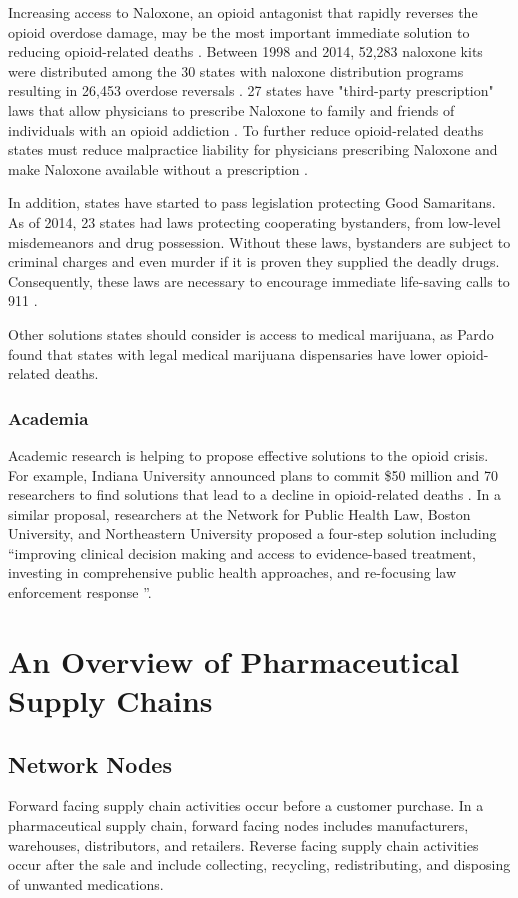 \documentclass[sigconf]{acmart}
\begin{document}
Increasing access to Naloxone, an opioid antagonist that rapidly reverses the opioid overdose damage, may be the most important immediate solution to reducing opioid-related deaths \cite{Hawk01}. Between 1998 and 2014, 52,283 naloxone kits were distributed among the 30 states with naloxone distribution programs resulting in 26,453 overdose reversals \cite{Hawk01}. 27 states have "third-party prescription" laws that allow physicians to prescribe Naloxone to family and friends of individuals with an opioid addiction \cite{Hawk01}. To further reduce opioid-related deaths states must reduce malpractice liability for physicians prescribing Naloxone and make Naloxone available without a prescription \cite{Hawk01}.

In addition, states have started to pass legislation protecting Good Samaritans. As of 2014, 23 states had laws protecting cooperating bystanders, from low-level misdemeanors and drug possession. Without these laws, bystanders are subject to criminal charges and even murder if it is proven they supplied the deadly drugs. Consequently, these laws are necessary to encourage immediate life-saving calls to 911 \cite{Burris01} \cite{Hawk01}. 

Other solutions states should consider is access to medical marijuana, as Pardo \cite{pardo01} found that states with legal medical marijuana dispensaries have lower opioid-related deaths.

\subsubsection{Academia}
Academic research is helping to propose effective solutions to the opioid crisis. For example, Indiana University announced plans to commit \$50 million and 70 researchers to find solutions that lead to a decline in opioid-related deaths \cite{Rudavsky01}. In a similar proposal, researchers at the Network for Public Health Law, Boston University, and Northeastern University proposed a four-step solution including ``improving clinical decision making and access to evidence-based treatment, investing in comprehensive public health approaches, and re-focusing law enforcement response ''\cite{Davis01}.

\section{An Overview of Pharmaceutical Supply Chains}
\subsection{Network Nodes}
Forward facing supply chain activities occur before a customer purchase. In a pharmaceutical supply chain, forward facing nodes includes manufacturers, warehouses, distributors, and retailers. Reverse facing supply chain activities occur after the sale and include collecting, recycling, redistributing, and disposing of unwanted medications.  
\end{document}

